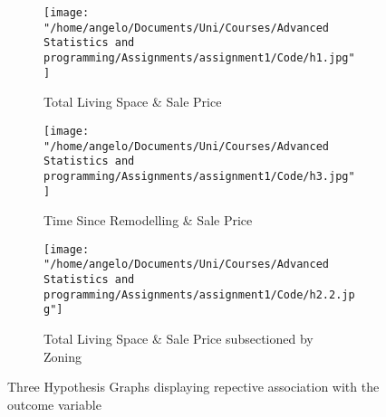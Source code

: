 \documentclass[a4paper]{article}
\begin{document}
\begin{wrapfigure}{L}{8.5cm}
\centering
\begin{subfigure}[b]{0.45\textwidth}
    \texttt{[image: "/home/angelo/Documents/Uni/Courses/Advanced Statistics and programming/Assignments/assignment1/Code/h1.jpg"]} 
   \caption{Total Living Space \& Sale Price}
   \label{fig:Ng2}
\end{subfigure}

\begin{subfigure}[b]{0.45\textwidth}
    \texttt{[image: "/home/angelo/Documents/Uni/Courses/Advanced Statistics and programming/Assignments/assignment1/Code/h3.jpg"]} 
   \caption{Time Since Remodelling \& Sale Price}
   \label{fig:Ng2}
\end{subfigure}

\begin{subfigure}[b]{0.45\textwidth}
    \texttt{[image: "/home/angelo/Documents/Uni/Courses/Advanced Statistics and programming/Assignments/assignment1/Code/h2.2.jpg"]}  
   \caption{Total Living Space \& Sale Price subsectioned by Zoning}
   \label{fig:Ng2}
\end{subfigure}
\captionsetup{justification=centering}
\caption{Three Hypothesis Graphs displaying repective association with the outcome variable}
\end{wrapfigure}
\end{document}
